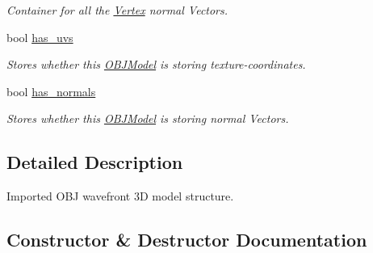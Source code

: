 \begin{DoxyCompactItemize}
\begin{DoxyCompactList}\small\item\em Container for all the \mbox{\hyperlink{class_vertex}{Vertex}} normal Vectors. \end{DoxyCompactList}\item 
\mbox{\label{classtz_1_1graphics_1_1model_1_1_o_b_j_model_a0f8dd322a5a87885243cb82d3361d643}} 
bool \mbox{\hyperlink{classtz_1_1graphics_1_1model_1_1_o_b_j_model_a0f8dd322a5a87885243cb82d3361d643}{has\+\_\+uvs}}
\begin{DoxyCompactList}\small\item\em Stores whether this \mbox{\hyperlink{classtz_1_1graphics_1_1model_1_1_o_b_j_model}{O\+B\+J\+Model}} is storing texture-\/coordinates. \end{DoxyCompactList}\item 
\mbox{\label{classtz_1_1graphics_1_1model_1_1_o_b_j_model_ac5252486a68257bbc480d516d10bf7ba}} 
bool \mbox{\hyperlink{classtz_1_1graphics_1_1model_1_1_o_b_j_model_ac5252486a68257bbc480d516d10bf7ba}{has\+\_\+normals}}
\begin{DoxyCompactList}\small\item\em Stores whether this \mbox{\hyperlink{classtz_1_1graphics_1_1model_1_1_o_b_j_model}{O\+B\+J\+Model}} is storing normal Vectors. \end{DoxyCompactList}\end{DoxyCompactItemize}


\subsection{Detailed Description}
Imported O\+BJ wavefront 3D model structure. 

\subsection{Constructor \& Destructor Documentation}
\mbox{\label{classtz_1_1graphics_1_1model_1_1_o_b_j_model_a12782990aef3edbf3989dd5115a27c2d}} 
